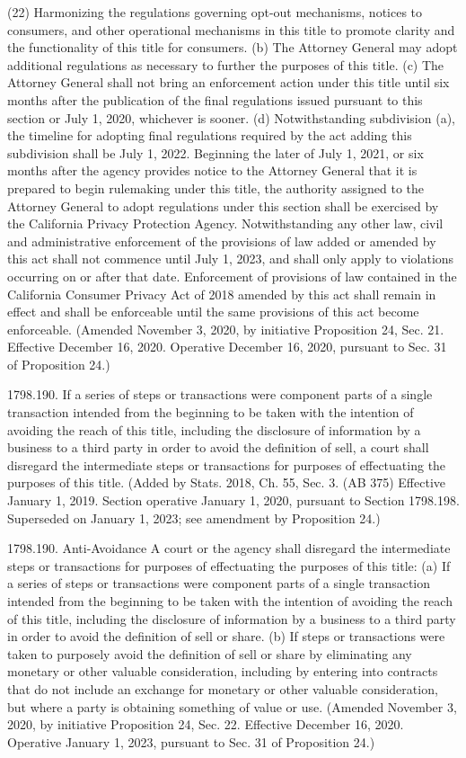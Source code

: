 (22) Harmonizing the regulations governing opt-out mechanisms, notices to consumers, and other operational mechanisms in this title to promote clarity and the functionality of this title for consumers.
(b) The Attorney General may adopt additional regulations as necessary to further the purposes of this title.
(c) The Attorney General shall not bring an enforcement action under this title until six months after the publication of the final regulations issued pursuant to this section or July 1, 2020, whichever is sooner.
(d) Notwithstanding subdivision (a), the timeline for adopting final regulations required by the act adding this subdivision shall be July 1, 2022. Beginning the later of July 1, 2021, or six months after the agency provides notice to the Attorney General that it is prepared to begin rulemaking under this title, the authority assigned to the Attorney General to adopt regulations under this section shall be exercised by the California Privacy Protection Agency. Notwithstanding any other law, civil and administrative enforcement of the provisions of law added or amended by this act shall not commence until July 1, 2023, and shall only apply to violations occurring on or after that date. Enforcement of provisions of law contained in the California Consumer Privacy Act of 2018 amended by this act shall remain in effect and shall be enforceable until the same provisions of this act become enforceable.
(Amended November 3, 2020, by initiative Proposition 24, Sec. 21. Effective December 16, 2020. Operative December 16, 2020, pursuant to Sec. 31 of Proposition 24.)

1798.190.  If a series of steps or transactions were component parts of a single transaction intended from the beginning to be taken with the intention of avoiding the reach of this title, including the disclosure of information by a business to a third party in order to avoid the definition of sell, a court shall disregard the intermediate steps or transactions for purposes of effectuating the purposes of this title.
(Added by Stats. 2018, Ch. 55, Sec. 3. (AB 375) Effective January 1, 2019. Section operative January 1, 2020, pursuant to Section 1798.198. Superseded on January 1, 2023; see amendment by Proposition 24.)

1798.190.  Anti-Avoidance
A court or the agency shall disregard the intermediate steps or transactions for purposes of effectuating the purposes of this title:
(a) If a series of steps or transactions were component parts of a single transaction intended from the beginning to be taken with the intention of avoiding the reach of this title, including the disclosure of information by a business to a third party in order to avoid the definition of sell or share.
(b) If steps or transactions were taken to purposely avoid the definition of sell or share by eliminating any monetary or other valuable consideration, including by entering into contracts that do not include an exchange for monetary or other valuable consideration, but where a party is obtaining something of value or use.
(Amended November 3, 2020, by initiative Proposition 24, Sec. 22. Effective December 16, 2020. Operative January 1, 2023, pursuant to Sec. 31 of Proposition 24.)

